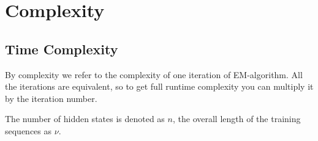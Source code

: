 \documentclass[thesis=M,english]{FITthesis}[2012/10/20]
\begin{document}

\section{Complexity}\label{sec:complex}

\subsection{Time Complexity}

By complexity we refer to the complexity of one iteration of EM-algorithm. All the iterations are equivalent, so to get full runtime complexity you can multiply it by the iteration number.

The number of hidden states is denoted as $n$, the overall length of the training sequences as $\nu$. 
\end{document}
